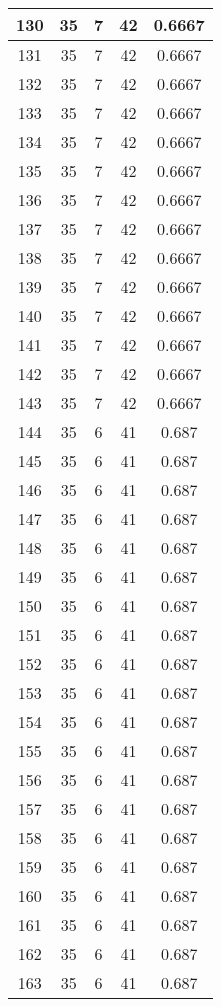\documentclass[letterpaper, 12pt]{article}
\begin{document}
\begin{longtable}{|c|c|c|c|c|}
\hline
130 & 35 & 7 & 42 & 0.6667 \\
\hline
131 & 35 & 7 & 42 & 0.6667 \\
\hline
132 & 35 & 7 & 42 & 0.6667 \\
\hline
133 & 35 & 7 & 42 & 0.6667 \\
\hline
134 & 35 & 7 & 42 & 0.6667 \\
\hline
135 & 35 & 7 & 42 & 0.6667 \\
\hline
136 & 35 & 7 & 42 & 0.6667 \\
\hline
137 & 35 & 7 & 42 & 0.6667 \\
\hline
138 & 35 & 7 & 42 & 0.6667 \\
\hline
139 & 35 & 7 & 42 & 0.6667 \\
\hline
140 & 35 & 7 & 42 & 0.6667 \\
\hline
141 & 35 & 7 & 42 & 0.6667 \\
\hline
142 & 35 & 7 & 42 & 0.6667 \\
\hline
143 & 35 & 7 & 42 & 0.6667 \\
\hline
144 & 35 & 6 & 41 & 0.687 \\
\hline
145 & 35 & 6 & 41 & 0.687 \\
\hline
146 & 35 & 6 & 41 & 0.687 \\
\hline
147 & 35 & 6 & 41 & 0.687 \\
\hline
148 & 35 & 6 & 41 & 0.687 \\
\hline
149 & 35 & 6 & 41 & 0.687 \\
\hline
150 & 35 & 6 & 41 & 0.687 \\
\hline
151 & 35 & 6 & 41 & 0.687 \\
\hline
152 & 35 & 6 & 41 & 0.687 \\
\hline
153 & 35 & 6 & 41 & 0.687 \\
\hline
154 & 35 & 6 & 41 & 0.687 \\
\hline
155 & 35 & 6 & 41 & 0.687 \\
\hline
156 & 35 & 6 & 41 & 0.687 \\
\hline
157 & 35 & 6 & 41 & 0.687 \\
\hline
158 & 35 & 6 & 41 & 0.687 \\
\hline
159 & 35 & 6 & 41 & 0.687 \\
\hline
160 & 35 & 6 & 41 & 0.687 \\
\hline
161 & 35 & 6 & 41 & 0.687 \\
\hline
162 & 35 & 6 & 41 & 0.687 \\
\hline
163 & 35 & 6 & 41 & 0.687 \\
\hline

\end{longtable}
\end{document}
